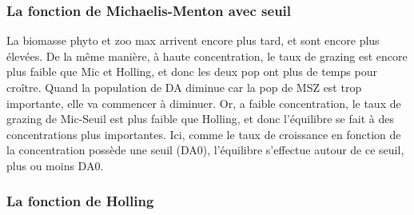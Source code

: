 {\subsubsection{La fonction de Michaelis-Menton avec seuil}
\par{
La biomasse phyto et zoo max arrivent encore plus tard, et sont encore plus élevées. De la même manière,
à haute concentration, le taux de grazing est encore plus faible que Mic et Holling, et donc les deux
pop ont plus de temps pour croître. Quand la population de DA diminue car la pop de MSZ est trop importante,
elle va commencer à diminuer. Or, a faible concentration, le taux de grazing de Mic-Seuil est plus faible
que Holling, et donc l'équilibre se fait à des concentrations plus importantes.
Ici, comme le taux de croissance en fonction de la concentration possède une seuil (DA0), l'équilibre
s'effectue autour de ce seuil, plus ou moins DA0. 
}
\subsubsection{La fonction de Holling}
\par{
}

}
